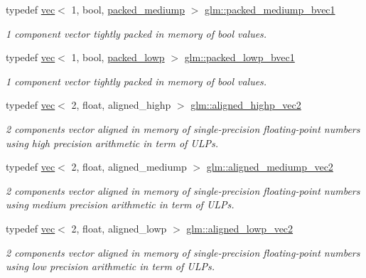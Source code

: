 \begin{DoxyCompactItemize}
typedef \hyperlink{structglm_1_1vec}{vec}$<$ 1, bool, \hyperlink{namespaceglm_a36ed105b07c7746804d7fdc7cc90ff25a9604654c3b137cd7898689fd34b25bc0}{packed\+\_\+mediump} $>$ \hyperlink{group__gtc__type__aligned_ga1dd6d3757af9269de00ba70b0f65a648}{glm\+::packed\+\_\+mediump\+\_\+bvec1}
\begin{DoxyCompactList}\small\item\em 1 component vector tightly packed in memory of bool values. \end{DoxyCompactList}\item 
typedef \hyperlink{structglm_1_1vec}{vec}$<$ 1, bool, \hyperlink{namespaceglm_a36ed105b07c7746804d7fdc7cc90ff25ac36a4bd74559be2c0b65bc48e5953b8b}{packed\+\_\+lowp} $>$ \hyperlink{group__gtc__type__aligned_gab43c5df4bb326006091ee3489bc1c367}{glm\+::packed\+\_\+lowp\+\_\+bvec1}
\begin{DoxyCompactList}\small\item\em 1 component vector tightly packed in memory of bool values. \end{DoxyCompactList}\item 
typedef \hyperlink{structglm_1_1vec}{vec}$<$ 2, float, aligned\+\_\+highp $>$ \hyperlink{group__gtc__type__aligned_ga7467c1a16f31911de3b927338434af6d}{glm\+::aligned\+\_\+highp\+\_\+vec2}
\begin{DoxyCompactList}\small\item\em 2 components vector aligned in memory of single-\/precision floating-\/point numbers using high precision arithmetic in term of U\+L\+Ps. \end{DoxyCompactList}\item 
typedef \hyperlink{structglm_1_1vec}{vec}$<$ 2, float, aligned\+\_\+mediump $>$ \hyperlink{group__gtc__type__aligned_ga96e85f0817c2c6734af6c981ce2b3940}{glm\+::aligned\+\_\+mediump\+\_\+vec2}
\begin{DoxyCompactList}\small\item\em 2 components vector aligned in memory of single-\/precision floating-\/point numbers using medium precision arithmetic in term of U\+L\+Ps. \end{DoxyCompactList}\item 
typedef \hyperlink{structglm_1_1vec}{vec}$<$ 2, float, aligned\+\_\+lowp $>$ \hyperlink{group__gtc__type__aligned_ga10048e69ffac79ec5ea059398485114e}{glm\+::aligned\+\_\+lowp\+\_\+vec2}
\begin{DoxyCompactList}\small\item\em 2 components vector aligned in memory of single-\/precision floating-\/point numbers using low precision arithmetic in term of U\+L\+Ps. \end{DoxyCompactList}\item 

\end{DoxyCompactItemize}
